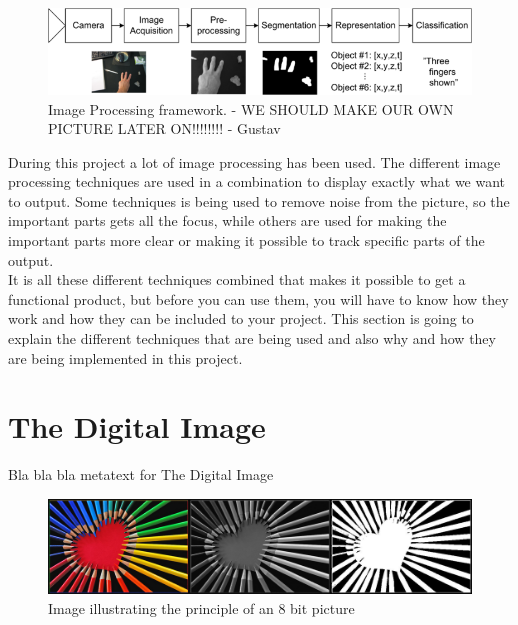 \begin{figure}[htbp]
\centering
\includegraphics[width=1.00\textwidth]{Pictures/Theory/imageProcessing_steps.png}
\caption{Image Processing framework. - WE SHOULD MAKE OUR OWN PICTURE LATER ON!!!!!!!! - Gustav}
\label{fig:ip_framework}
\end{figure}

During this project a lot of image processing has been used. The different image processing techniques are used in a combination to display exactly what we want to output. Some techniques is being used to remove noise from the picture, so the important parts gets all the focus, while others are used for making the important parts more clear or making it possible to track specific parts of the output. \\
It is all these different techniques combined that makes it possible to get a functional product, but before you can use them, you will have to know how they work and how they can be included to your project. This section is going to explain the different techniques that are being used and also why and how they are being implemented in this project.

\section{The Digital Image}
Bla bla bla metatext for The Digital Image
\begin{figure}[htbp]
\centering
\includegraphics[width=1.00\textwidth]{Pictures/Theory/ColoredToGrayscaleToBinary.jpg}
\caption{Image illustrating the principle of an 8 bit picture}
\label{fig:ColoredToGrayscaleToBinary}
\end{figure}


